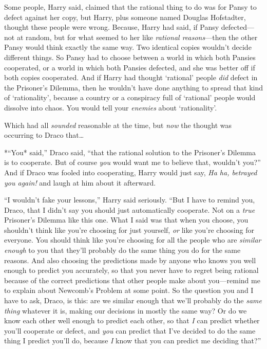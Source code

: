 Some people, Harry said, claimed that the rational thing to do was for
Pansy to defect against her copy, but Harry, plus someone named Douglas
Hofstadter, thought these people were wrong. Because, Harry had said, if
Pansy defected---not at random, but for what seemed to her like
\emph{rational reasons}---then the other Pansy would think exactly the
same way. Two identical copies wouldn't decide different things. So
Pansy had to choose between a world in which both Pansies cooperated, or
a world in which both Pansies defected, and she was better off if both
copies cooperated. And if Harry had thought `rational' people \emph{did}
defect in the Prisoner's Dilemma, then he wouldn't have done anything to
spread that kind of `rationality', because a country or a conspiracy
full of `rational' people would dissolve into chaos. You would tell your
\emph{enemies} about `rationality'.

Which had all \emph{sounded} reasonable at the time, but \emph{now} the
thought was occurring to Draco that\ldots{}

*``You* said,'' Draco said, ``that the rational solution to the
Prisoner's Dilemma is to cooperate. But of course \emph{you} would want
me to believe that, wouldn't you?'' And if Draco was fooled into
cooperating, Harry would just say, \emph{Ha ha, betrayed you again!} and
laugh at him about it afterward.

``I wouldn't fake your lessons,'' Harry said seriously. ``But I have to
remind you, Draco, that I didn't say you should just automatically
cooperate. Not on a \emph{true} Prisoner's Dilemma like this one. What I
said was that when you choose, you shouldn't think like you're choosing
for just yourself, \emph{or} like you're choosing for everyone. You
should think like you're choosing for all the people who are
\emph{similar enough} to you that they'll probably do the same thing you
do for the same reasons. And also choosing the predictions made by
anyone who knows you well enough to predict you accurately, so that you
never have to regret being rational because of the correct predictions
that other people make about you---remind me to explain about Newcomb's
Problem at some point. So the question you and I have to ask, Draco, is
this: are we similar enough that we'll probably do the \emph{same thing}
whatever it is, making our decisions in mostly the same way? Or do we
know each other well enough to predict each other, so that \emph{I} can
predict whether you'll cooperate or defect, and \emph{you} can predict
that I've decided to do the same thing I predict you'll do, because
\emph{I} know that you can predict me deciding that?''

